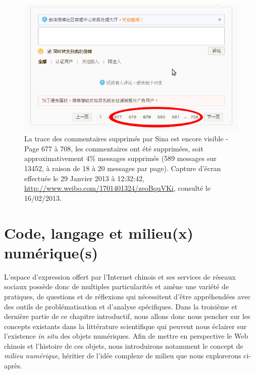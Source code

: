 \begin{figure}[ht]
    \centering
    \includegraphics[scale=0.5]{figures/chap1/comments.png}
    \caption[Commentaires supprimés par Sina]{La trace des commentaires supprimés par Sina est encore visible - Page 677 à 708, les commentaires ont été supprimées, soit approximativement 4\% messages supprimés (589 messages sur 13452, à raison de 18 à 20 messages par page). Capture d’écran effectuée le 29 Janvier 2013 à 12:32:42, \url{http://www.weibo.com/1701401324/zeoBquVKi}, consulté le 16/02/2013.}
    \label{fig:comments}
\end{figure}


\section[Code, langage et milieu(x) numérique(s)]{ Code, langage et milieu(x) numérique(s)}
L’espace d’expression offert par l’Internet chinois et ses services de réseaux sociaux possède donc de multiples particularités et amène une variété de pratiques, de questions et de réflexions qui nécessitent d’être appréhendées avec des outils de problématisation et d’analyse spécifiques. Dans la troisième et dernière partie de ce chapitre introductif, nous allons donc nous pencher sur les concepts existants dans la littérature scientifique qui peuvent nous éclairer sur l’existence \textit{in situ} des objets numériques. Afin de mettre en perspective le Web chinois et l’histoire de ces objets, nous introduirons notamment le concept de \textit{milieu numérique}, héritier de l’idée complexe de milieu que nous explorerons ci-après.

